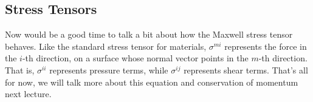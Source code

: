 \subsection{Stress Tensors}
Now would be a good time to talk a bit about how the Maxwell stress tensor behaves. Like the standard stress
tensor for materials, \( \sigma^{mi} \) represents the force in the \( i \)-th direction, on a surface whose
normal vector points in the \( m \)-th direction. That is, \( \sigma^{ii} \) represents pressure terms, while
\( \sigma^{ij} \) represents shear terms. That's all for now, we will talk more about this equation and
conservation of momentum next lecture.    


